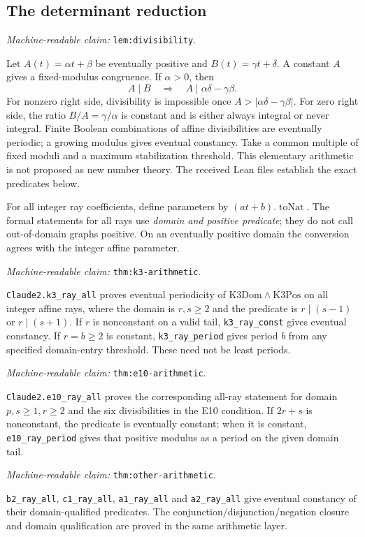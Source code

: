 \documentclass[11pt]{amsart}
\newcommand{\record}[1]{\nolinkurl{#1}}
\newcommand{\claimid}[1]{\par\nopagebreak\noindent\textit{Machine-readable claim:} \record{#1}.\par}
\theoremstyle{definition}\newtheorem{definition}{Definition}
\begin{document}
\subsection{The determinant reduction}\label{lem:divisibility}
\claimid{lem:divisibility}
Let $A(t)=\alpha t+\beta$ be eventually positive and
$B(t)=\gamma t+\delta$. A constant $A$ gives a fixed-modulus
congruence. If $\alpha>0$, then
\begin{equation}\label{eq:determinant}
 A\mid B\quad\Longrightarrow\quad A\mid\alpha\delta-\gamma\beta.
\end{equation}
For nonzero right side, divisibility is impossible once
$A>|\alpha\delta-\gamma\beta|$. For zero right side, the ratio
$B/A=\gamma/\alpha$ is constant and is either always integral or
never integral. Finite Boolean combinations of affine divisibilities
are eventually periodic; a growing modulus gives eventual constancy.
Take a common multiple of fixed moduli and a maximum stabilization
threshold. This elementary arithmetic is not proposed as new number
theory. The received Lean files establish the exact predicates below.

For all integer ray coefficients, define parameters by
$(at+b).\operatorname{toNat}$. The formal statements for all rays use
\emph{domain and positive predicate}; they do not call out-of-domain
graphs positive. On an eventually positive domain the conversion
agrees with the integer affine parameter.
\label{thm:k3-arithmetic}\claimid{thm:k3-arithmetic}
\record{Claude2.k3_ray_all} proves eventual periodicity of
$\mathrm{K3Dom}\wedge\mathrm{K3Pos}$ on all integer affine rays,
where the domain is $r,s\ge2$ and the predicate is
$r\mid(s-1)$ or $r\mid(s+1)$. If $r$ is nonconstant on a valid tail,
\record{k3_ray_const} gives eventual constancy. If $r=b\ge2$ is
constant, \record{k3_ray_period} gives period $b$ from any specified
domain-entry threshold. These need not be least periods.
\label{thm:e10-arithmetic}\claimid{thm:e10-arithmetic}
\record{Claude2.e10_ray_all} proves the corresponding all-ray statement
for domain $p,s\ge1,r\ge2$ and the six divisibilities in the E10
condition. If $2r+s$ is nonconstant, the predicate is eventually
constant; when it is constant, \record{e10_ray_period} gives that
positive modulus as a period on the given domain tail.
\label{thm:other-arithmetic}\claimid{thm:other-arithmetic}
\record{b2_ray_all}, \record{c1_ray_all}, \record{a1_ray_all} and
\record{a2_ray_all} give eventual constancy of their domain-qualified
predicates. The conjunction/disjunction/negation closure and domain
qualification are proved in the same arithmetic layer.
\end{document}

